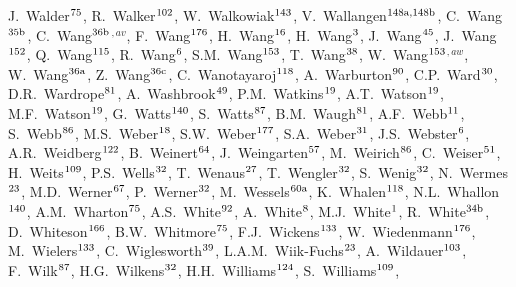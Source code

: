 \begin{flushleft}
J.~Walder$^\textrm{\scriptsize 75}$,
R.~Walker$^\textrm{\scriptsize 102}$,
W.~Walkowiak$^\textrm{\scriptsize 143}$,
V.~Wallangen$^\textrm{\scriptsize 148a,148b}$,
C.~Wang$^\textrm{\scriptsize 35b}$,
C.~Wang$^\textrm{\scriptsize 36b}$$^{,av}$,
F.~Wang$^\textrm{\scriptsize 176}$,
H.~Wang$^\textrm{\scriptsize 16}$,
H.~Wang$^\textrm{\scriptsize 3}$,
J.~Wang$^\textrm{\scriptsize 45}$,
J.~Wang$^\textrm{\scriptsize 152}$,
Q.~Wang$^\textrm{\scriptsize 115}$,
R.~Wang$^\textrm{\scriptsize 6}$,
S.M.~Wang$^\textrm{\scriptsize 153}$,
T.~Wang$^\textrm{\scriptsize 38}$,
W.~Wang$^\textrm{\scriptsize 153}$$^{,aw}$,
W.~Wang$^\textrm{\scriptsize 36a}$,
Z.~Wang$^\textrm{\scriptsize 36c}$,
C.~Wanotayaroj$^\textrm{\scriptsize 118}$,
A.~Warburton$^\textrm{\scriptsize 90}$,
C.P.~Ward$^\textrm{\scriptsize 30}$,
D.R.~Wardrope$^\textrm{\scriptsize 81}$,
A.~Washbrook$^\textrm{\scriptsize 49}$,
P.M.~Watkins$^\textrm{\scriptsize 19}$,
A.T.~Watson$^\textrm{\scriptsize 19}$,
M.F.~Watson$^\textrm{\scriptsize 19}$,
G.~Watts$^\textrm{\scriptsize 140}$,
S.~Watts$^\textrm{\scriptsize 87}$,
B.M.~Waugh$^\textrm{\scriptsize 81}$,
A.F.~Webb$^\textrm{\scriptsize 11}$,
S.~Webb$^\textrm{\scriptsize 86}$,
M.S.~Weber$^\textrm{\scriptsize 18}$,
S.W.~Weber$^\textrm{\scriptsize 177}$,
S.A.~Weber$^\textrm{\scriptsize 31}$,
J.S.~Webster$^\textrm{\scriptsize 6}$,
A.R.~Weidberg$^\textrm{\scriptsize 122}$,
B.~Weinert$^\textrm{\scriptsize 64}$,
J.~Weingarten$^\textrm{\scriptsize 57}$,
M.~Weirich$^\textrm{\scriptsize 86}$,
C.~Weiser$^\textrm{\scriptsize 51}$,
H.~Weits$^\textrm{\scriptsize 109}$,
P.S.~Wells$^\textrm{\scriptsize 32}$,
T.~Wenaus$^\textrm{\scriptsize 27}$,
T.~Wengler$^\textrm{\scriptsize 32}$,
S.~Wenig$^\textrm{\scriptsize 32}$,
N.~Wermes$^\textrm{\scriptsize 23}$,
M.D.~Werner$^\textrm{\scriptsize 67}$,
P.~Werner$^\textrm{\scriptsize 32}$,
M.~Wessels$^\textrm{\scriptsize 60a}$,
K.~Whalen$^\textrm{\scriptsize 118}$,
N.L.~Whallon$^\textrm{\scriptsize 140}$,
A.M.~Wharton$^\textrm{\scriptsize 75}$,
A.S.~White$^\textrm{\scriptsize 92}$,
A.~White$^\textrm{\scriptsize 8}$,
M.J.~White$^\textrm{\scriptsize 1}$,
R.~White$^\textrm{\scriptsize 34b}$,
D.~Whiteson$^\textrm{\scriptsize 166}$,
B.W.~Whitmore$^\textrm{\scriptsize 75}$,
F.J.~Wickens$^\textrm{\scriptsize 133}$,
W.~Wiedenmann$^\textrm{\scriptsize 176}$,
M.~Wielers$^\textrm{\scriptsize 133}$,
C.~Wiglesworth$^\textrm{\scriptsize 39}$,
L.A.M.~Wiik-Fuchs$^\textrm{\scriptsize 23}$,
A.~Wildauer$^\textrm{\scriptsize 103}$,
F.~Wilk$^\textrm{\scriptsize 87}$,
H.G.~Wilkens$^\textrm{\scriptsize 32}$,
H.H.~Williams$^\textrm{\scriptsize 124}$,
S.~Williams$^\textrm{\scriptsize 109}$,

\end{flushleft}

